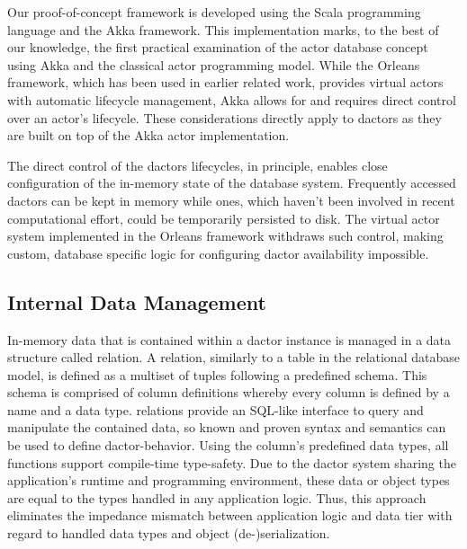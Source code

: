 Our proof-of-concept framework is developed using the Scala programming language and the Akka framework.
This implementation marks, to the best of our knowledge, the first practical examination of the actor database concept using Akka and the classical actor programming model.
While the Orleans framework, which has been used in earlier related work, provides virtual actors with automatic lifecycle management, Akka allows for and requires direct control over an actor's lifecycle.
These considerations directly apply to \glspl{dactor} as they are built on top of the Akka actor implementation.

The direct control of the \glspl{dactor} lifecycles, in principle, enables close configuration of the in-memory state of the database system.
Frequently accessed \glspl{dactor} can be kept in memory while ones, which haven't been involved in recent computational effort, could be temporarily persisted to disk.
The virtual actor system implemented in the Orleans framework withdraws such control, making custom, database specific logic for configuring \gls{dactor} availability impossible.

\subsection{Internal Data Management}

In-memory data that is contained within a \gls{dactor} instance is managed in a data structure called \gls{relation}.
A \gls{relation}, similarly to a table in the relational database model, is defined as a multiset of tuples following a predefined schema.
This schema is comprised of column definitions whereby every column is defined by a name and a data type.
\Glspl{relation} provide an SQL-like interface to query and manipulate the contained data, so known and proven syntax and semantics can be used to define \gls{dactor}-behavior.
Using the column's predefined data types, all functions support compile-time type-safety.
Due to the \gls{dactor} system sharing the application's runtime and programming environment, these data or object types are equal to the types handled in any application logic.
Thus, this approach eliminates the impedance mismatch between application logic and data tier with regard to handled data types and object (de-)serialization.

